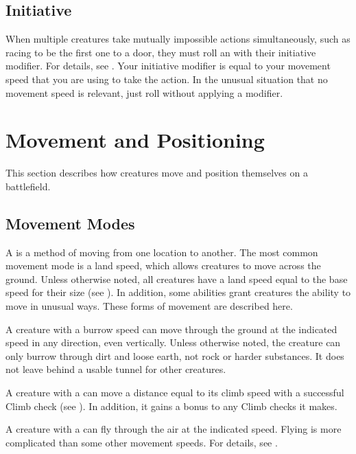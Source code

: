     \subsection{Initiative}\label{Initiative}
        When multiple creatures take mutually impossible actions simultaneously, such as racing to be the first one to a door, they must roll an  with their initiative modifier.
        For details, see .
        Your initiative modifier is equal to your movement speed that you are using to take the action.
        In the unusual situation that no movement speed is relevant, just roll without applying a modifier.

\section{Movement and Positioning}\label{Movement and Positioning}
    This section describes how creatures move and position themselves on a battlefield.

    \subsection{Movement Modes}\label{Movement Modes}
        A  is a method of moving from one location to another.
        The most common movement mode is a land speed, which allows creatures to move across the ground.
        Unless otherwise noted, all creatures have a land speed equal to the base speed for their size (see ).
        In addition, some abilities grant creatures the ability to move in unusual ways.
        These forms of movement are described here.

        A creature with a burrow speed can move through the ground at the indicated speed in any direction, even vertically. Unless otherwise noted, the creature can only burrow through dirt and loose earth, not rock or harder substances. It does not leave behind a usable tunnel for other creatures.

        A creature with a  can move a distance equal to its climb speed with a successful Climb check (see ).
        In addition, it gains a  bonus to any Climb checks it makes.

        \label{Flying}
        A creature with a  can fly through the air at the indicated speed.
        Flying is more complicated than some other movement speeds.
        For details, see .

